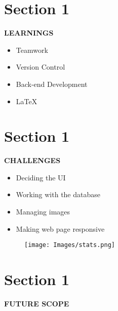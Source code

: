 \documentclass[10pt]{beamer} %
\begin{document}
\section{Section 1}
{\sectionheaderSkin %
\begin{frame}{\textbf{LEARNINGS}}{
    \begin{itemize}
         \item Teamwork
         \item Version Control
         \item Back-end Development
         \item LaTeX
    \end{itemize}
}
\end{frame}
}

\section{Section 1}
{\sectionheaderSkin %
\begin{frame}{\textbf{CHALLENGES}}{
    \begin{itemize}
         \item Deciding the UI
         \item Working with the database
         \item Managing images
         \item Making web page responsive
    \end{itemize}
}
\end{frame}
}


\begin{frame}{
    \vspace{1.5cm}
    \begin{figure}
        \texttt{[image: Images/stats.png]}
    \end{figure}
}
\end{frame}

\section{Section 1}
{\sectionheaderWhite %
\begin{frame}{\textbf{FUTURE SCOPE}}{}
\end{frame}
}
\end{document}
